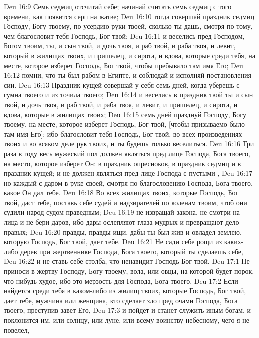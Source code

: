 \rsbpar\vs Deu 16:9 Семь седмиц отсчитай себе; начинай считать семь седмиц с того времени, как появится серп на жатве;
\vs Deu 16:10 тогда совершай праздник седмиц Господу, Богу твоему, по усердию руки твоей, сколько ты дашь, смотря по тому, чем благословит тебя Господь, Бог твой;
\vs Deu 16:11 и веселись пред Господом, Богом твоим, ты, и сын твой, и дочь твоя, и раб твой, и раба твоя, и левит, который в жилищах твоих, и пришелец, и сирота, и вдова, которые среди тебя, на месте, которое изберет Господь, Бог твой, чтобы пребывало там имя Его;
\vs Deu 16:12 помни, что ты был рабом в Египте, и соблюдай и исполняй постановления сии.
\rsbpar\vs Deu 16:13 Праздник кущей совершай у себя семь дней, когда уберешь с гумна твоего и из точила твоего;
\vs Deu 16:14 и веселись в праздник твой ты и сын твой, и дочь твоя, и раб твой, и раба твоя, и левит, и пришелец, и сирота, и вдова, которые в жилищах твоих;
\vs Deu 16:15 семь дней празднуй Господу, Богу твоему, на месте, которое изберет Господь, Бог твой, [чтобы призываемо было там имя Его]; ибо благословит тебя Господь, Бог твой, во всех произведениях твоих и во всяком деле рук твоих, и ты будешь только веселиться.
\rsbpar\vs Deu 16:16 Три раза в году весь мужеский пол должен являться пред лице Господа, Бога твоего, на место, которое изберет Он: в праздник опресноков, в праздник седмиц и в праздник кущей; и  не должен являться пред лице Господа с пустыми ,
\vs Deu 16:17 но каждый с даром в руке своей, смотря по благословению Господа, Бога твоего, какое Он дал тебе.
\rsbpar\vs Deu 16:18 Во всех жилищах твоих, которые Господь, Бог твой, даст тебе, поставь себе судей и надзирателей по коленам твоим, чтоб они судили народ судом праведным;
\vs Deu 16:19 не извращай закона, не смотри на лица и не бери даров, ибо дары ослепляют глаза мудрых и превращают дело правых;
\vs Deu 16:20 правды, правды ищи, дабы ты был жив и овладел землею, которую Господь, Бог твой, дает тебе.
\vs Deu 16:21 Не сади себе рощи из каких-либо дерев при жертвеннике Господа, Бога твоего, который ты сделаешь себе,
\vs Deu 16:22 и не ставь себе столба, что ненавидит Господь Бог твой.
\vs Deu 17:1 Не приноси в жертву Господу, Богу твоему, вола, или овцы, на которой будет порок,  что-нибудь худое, ибо это мерзость для Господа, Бога твоего.
\vs Deu 17:2 Если найдется среди тебя в каком-либо из жилищ твоих, которые Господь, Бог твой, дает тебе, мужчина или женщина, кто сделает зло пред очами Господа, Бога твоего, преступив завет Его,
\vs Deu 17:3 и пойдет и станет служить иным богам, и поклонится им, или солнцу, или луне, или всему воинству небесному, чего я не повелел,
